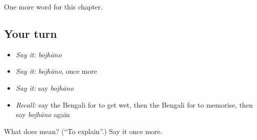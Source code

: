 \begin{grammarlens}[title={What you've built}]
One more word for this chapter.
\end{grammarlens}

\subsection*{Your turn}
\begin{itemize}
\raggedright
  \item \emph{Say it:} \emph{bojhāno}
  \item \emph{Say it:} \emph{bojhāno}, once more
  \item \emph{Say it:} say \emph{bojhāno}
  \item \emph{Recall:} say the Bengali for to get wet, then the Bengali for to memorise, then say \emph{bojhāno} again
\end{itemize}

\begin{tcolorbox}[breakable,colback=teal!4,colframe=teal!35!black,title={Before you move on}]
What does  mean? (\textquotedblleft{}To explain\textquotedblright{}.) Say it once more.
\end{tcolorbox}
